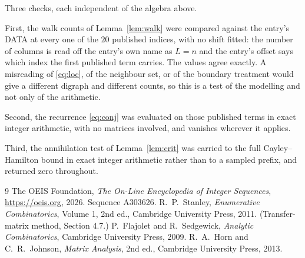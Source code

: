 \documentclass[11pt,a4paper]{article}
\theoremstyle{plain}
\theoremstyle{definition}
\begin{document}
Three checks, each independent of the algebra above.

First, the walk counts of Lemma~\ref{lem:walk} were compared against the entry's DATA at
every one of the $20$ published indices, with no shift fitted: the number of columns is
read off the entry's own name as $L=n$ and the entry's offset says which index the first
published term carries. The values agree exactly. A misreading of \eqref{eq:loc}, of the
neighbour set, or of the boundary treatment would give a different digraph and different
counts, so this is a test of the modelling and not only of the arithmetic.

Second, the recurrence \eqref{eq:conj} was evaluated on those published terms in exact
integer arithmetic, with no matrices involved, and vanishes wherever it applies.

Third, the annihilation test of Lemma~\ref{lem:crit} was carried to the full
Cayley--Hamilton bound in exact integer arithmetic rather than to a sampled prefix, and
returned zero throughout.

\begin{thebibliography}{9}
 The OEIS Foundation, \emph{The On-Line Encyclopedia of Integer
Sequences}, \url{https://oeis.org}, 2026. Sequence A303626.
 R.~P.~Stanley, \emph{Enumerative Combinatorics}, Volume 1, 2nd ed.,
Cambridge University Press, 2011. (Transfer-matrix method, Section 4.7.)
 P.~Flajolet and R.~Sedgewick, \emph{Analytic Combinatorics}, Cambridge
University Press, 2009.
 R.~A.~Horn and C.~R.~Johnson, \emph{Matrix Analysis}, 2nd ed., Cambridge
University Press, 2013.
\end{thebibliography}
\end{document}
